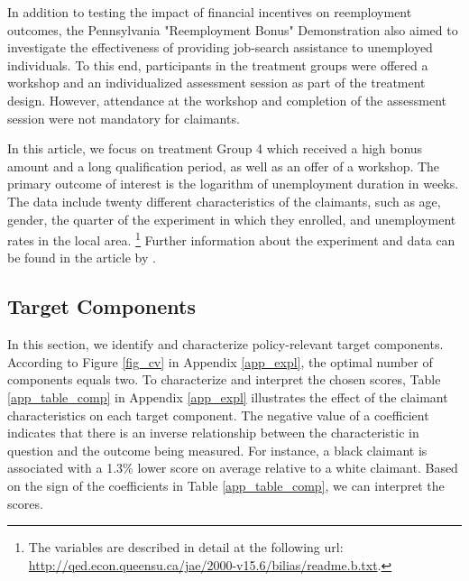 \documentclass[12pt]{article}
\begin{document}
In addition to testing the impact of financial incentives on reemployment outcomes, the Pennsylvania "Reemployment Bonus" Demonstration also aimed to investigate the effectiveness of providing job-search assistance to unemployed individuals. To this end, participants in the treatment groups were offered a workshop and an individualized assessment session as part of the treatment design. However, attendance at the workshop and completion of the assessment session were not mandatory for claimants.

In this article, we focus on treatment Group 4 which received a high bonus amount and a long qualification period, as well as an offer of a workshop. The primary outcome of interest is the logarithm of unemployment duration in weeks. The data include twenty different characteristics of the claimants, such as age, gender, the quarter of the experiment in which they enrolled, and unemployment rates in the local area. \footnote{The variables are described in detail at the following url: \url{http://qed.econ.queensu.ca/jae/2000-v15.6/bilias/readme.b.txt}.} Further information about the experiment and data can be found in the article by \cite{bilias2000sequential}.




\subsection{Target Components}
In this section, we identify and characterize policy-relevant target components. According to Figure \ref{fig_cv} in Appendix \ref{app_expl}, the optimal number of components equals two. To characterize and interpret the chosen scores, Table \ref{app_table_comp} in Appendix \ref{app_expl} illustrates the effect of the claimant characteristics on each target component. The negative value of a coefficient indicates that there is an inverse relationship between the characteristic in question and the outcome being measured. For instance, a black claimant is associated with a 1.3\% lower score on average relative to a white claimant. Based on the sign of the coefficients in Table \ref{app_table_comp}, we can interpret the scores.  
\end{document}

